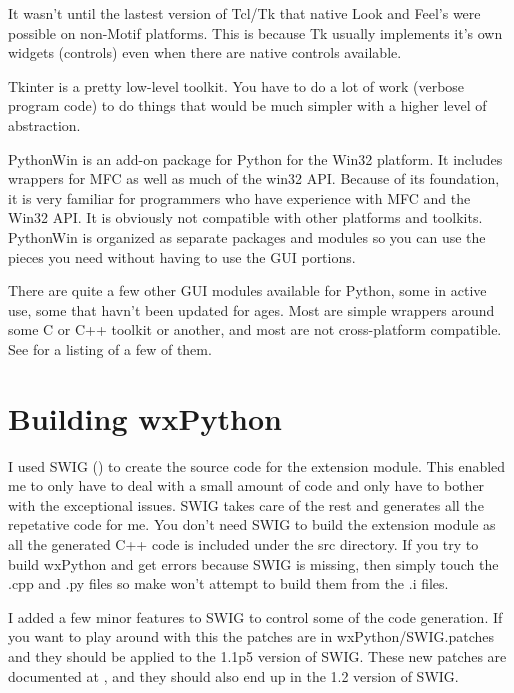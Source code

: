 It wasn't until the lastest version of Tcl/Tk that native Look and
Feel's were possible on non-Motif platforms.  This is because Tk
usually implements it's own widgets (controls) even when there are
native controls available.

Tkinter is a pretty low-level toolkit.  You have to do a lot of work
(verbose program code) to do things that would be much simpler with a higher
level of abstraction.


PythonWin is an add-on package for Python for the Win32 platform.  It
includes wrappers for MFC as well as much of the win32 API.  Because
of its foundation, it is very familiar for programmers who have
experience with MFC and the Win32 API.  It is obviously not compatible
with other platforms and toolkits.  PythonWin is organized as separate
packages and modules so you can use the pieces you need without having
to use the GUI portions.


There are quite a few other GUI modules available for Python, some in
active use, some that havn't been updated for ages.  Most are simple
wrappers around some C or C++ toolkit or another, and most are not
cross-platform compatible.  See 
for a listing of a few of them.

\section{Building wxPython}\label{wxpbuild}

I used SWIG () to
create the source code for the extension module.  This enabled me to
only have to deal with a small amount of code and only have to bother
with the exceptional issues.  SWIG takes care of the rest and
generates all the repetative code for me.  You don't need SWIG to
build the extension module as all the generated C++ code is included
under the src directory.  If you try to build wxPython and get errors
because SWIG is missing, then simply touch the .cpp and .py files so
make won't attempt to build them from the .i files.

I added a few minor features to SWIG to control some of the code
generation.  If you want to play around with this the patches are in
wxPython/SWIG.patches and they should be applied to the 1.1p5 version
of SWIG.  These new patches are documented at 
,
and they should also end up in the 1.2 version of SWIG.

